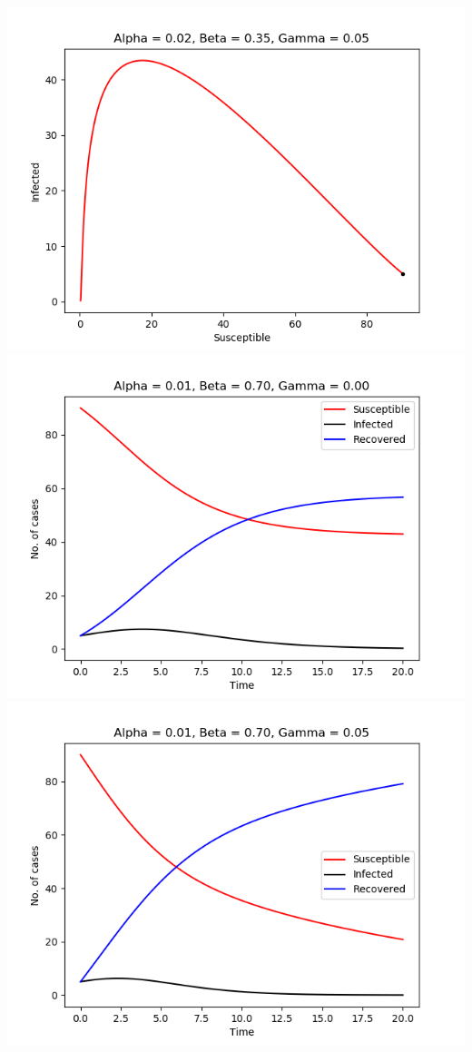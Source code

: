 \includegraphics[scale=0.4]{fig/img/a2_b35_g5.png}\\
\includegraphics[scale=0.4]{fig/img/t_a1_b7_g0.png}
\includegraphics[scale=0.4]{fig/img/t_a1_b7_g5.png}\\
